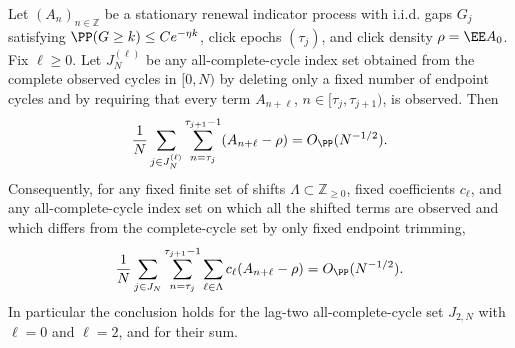 \begin{lemma}\label{lem:trimmed-shifted-click-centering-main}
Let \((A_n)_{n\in\mathbb Z}\) be a stationary renewal indicator process with
i.i.d. gaps \(G_j\) satisfying \(\PP(G\ge k)\le Ce^{-\eta k}\), click epochs
\((\tau_j)\), and click density \(\rho=\EE A_0\).  Fix
\(\ell\ge0\).  Let \(J_N^{(\ell)}\) be any all-complete-cycle index set
obtained from the complete observed cycles in \([0,N)\) by deleting only a
fixed number of endpoint cycles and by requiring that every term
\(A_{n+\ell}\), \(n\in[\tau_j,\tau_{j+1})\), is observed.  Then
\begin{equation}\label{eq:trimmed-shifted-click-centering-main}
\frac1N\sum_{j\in J_N^{(\ell)}}
\sum_{n=\tau_j}^{\tau_{j+1}-1}(A_{n+\ell}-\rho)
=O_{\PP}(N^{-1/2}) .
\end{equation}
Consequently, for any fixed finite set of shifts
\(\Lambda\subset\mathbb Z_{\ge0}\), fixed coefficients \(c_\ell\), and any
all-complete-cycle index set on which all the shifted terms are observed and
which differs from the complete-cycle set by only fixed endpoint trimming,
\begin{equation}\label{eq:trimmed-shifted-linear-combination-main}
\frac1N\sum_{j\in J_N}
\sum_{n=\tau_j}^{\tau_{j+1}-1}
\sum_{\ell\in\Lambda}c_\ell(A_{n+\ell}-\rho)
=O_{\PP}(N^{-1/2}) .
\end{equation}
In particular the conclusion holds for the lag-two all-complete-cycle set
\(J_{2,N}\) with \(\ell=0\) and \(\ell=2\), and for their sum.
\end{lemma}

